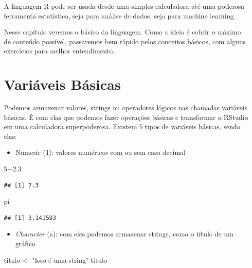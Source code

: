 \documentclass[]{book}
\newenvironment{Shaded}{\begin{snugshade}}{\end{snugshade}}
\newcommand{\DecValTok}[1]{\textcolor[rgb]{0.00,0.00,0.81}{#1}}
\newcommand{\FloatTok}[1]{\textcolor[rgb]{0.00,0.00,0.81}{#1}}
\newcommand{\StringTok}[1]{\textcolor[rgb]{0.31,0.60,0.02}{#1}}
\newcommand{\NormalTok}[1]{#1}
\providecommand{\tightlist}{%
  \setlength{\itemsep}{0pt}\setlength{\parskip}{0pt}}
\theoremstyle{definition}
\theoremstyle{definition}
\theoremstyle{definition}
\theoremstyle{remark}
\begin{document}
A linguagem R pode ser usada desde uma simples calculadora até uma
poderosa ferramenta estatística, seja para análise de dados, seja para
machine learning.

Nesse capítulo veremos o básico da linguagem. Como a ideia é cobrir o
máximo de conteúdo possível, passaremos bem rápido pelos conceitos
básicos, com alguns exercícios para melhor entendimento.

\section{Variáveis Básicas}\label{variaveis-basicas}

Podemos armazenar valores, strings ou operadores lógicos nas chamadas
variáveis básicas. É com elas que podemos fazer operações básicas e
transformar o RStudio em uma calculadora superpoderosa. Existem 5 tipos
de variáveis básicas, sendo elas:

\begin{itemize}
\tightlist
\item
  Numeric (1): valores numéricos com ou sem casa decimal
\end{itemize}

\begin{Shaded}
\begin{Highlighting}[]
\DecValTok{5}\FloatTok{+2.3}
\end{Highlighting}
\end{Shaded}

\begin{verbatim}
## [1] 7.3
\end{verbatim}

\begin{Shaded}
\begin{Highlighting}[]
\NormalTok{pi}
\end{Highlighting}
\end{Shaded}

\begin{verbatim}
## [1] 3.141593
\end{verbatim}

\begin{itemize}
\tightlist
\item
  \emph{Character} (a): com eles podemos armazenar strings, como o
  título de um gráfico
\end{itemize}

\begin{Shaded}
\begin{Highlighting}[]
\NormalTok{titulo <-}\StringTok{ "Isso é uma string"}
\NormalTok{titulo}
\end{Highlighting}
\end{Shaded}
\end{document}

